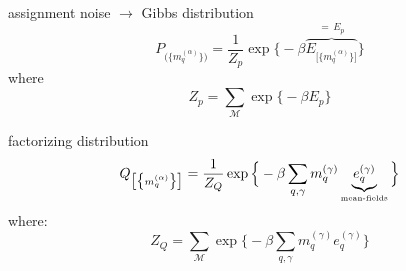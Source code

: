 
\begin{frame}[t] 

\svspace{-3mm}

\begin{block}{assignment noise $\rightarrow$ Gibbs distribution}
$$
	P_{ \big( \big\{ m_q^{(\alpha)} \big\} \big) }
	= \frac{1}{Z_p} \exp \Big\{ -\beta 
	\overbrace{
		E_{\big[ \big\{ m_q^{(\alpha)} \big\} \big]}
		}^{= \, E_p}
		\Big\}
$$
where
$$
	Z_p = \sum\limits_{\mathscr{M}} \exp \Big\{ -\beta
		E_p
		\Big\}
$$
\end{block}
\begin{block}{factorizing distribution}
$$
	Q_{ \big[ \big\{ m_q^{(\alpha)} \big\} \big] }
	= \frac{1}{Z_Q} \exp \Big\{ -\beta \sum\limits_{q, \gamma}
		m_q^{(\gamma)} \underbrace{ e_q^{(\gamma)} }_{
			\text{{\tiny mean-fields}} } \Big\}
$$
where:
$$
	Z_Q = \sum\limits_{\mathscr{M}} \exp \Big\{ -\beta \sum\limits_{q, 
		\gamma} m_q^{(\gamma)} e_q^{(\gamma)} \Big\}
$$
\end{block}
\end{frame}

